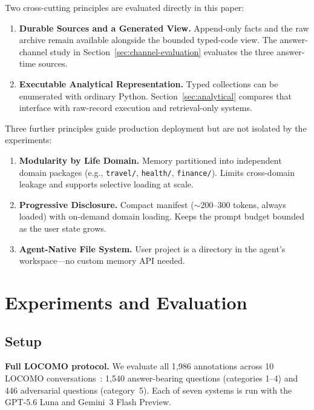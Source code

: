 Two cross-cutting principles are evaluated directly in this paper:

\begin{enumerate}[leftmargin=*]
\item \textbf{Durable Sources and a Generated View.} Append-only facts and the raw archive remain available alongside the bounded typed-code view. The answer-channel study in Section~\ref{sec:channel-evaluation} evaluates the three answer-time sources.
\item \textbf{Executable Analytical Representation.} Typed collections can be enumerated with ordinary Python. Section~\ref{sec:analytical} compares that interface with raw-record execution and retrieval-only systems.
\end{enumerate}

Three further principles guide production deployment but are not isolated by the experiments:

\begin{enumerate}[leftmargin=*,start=3]
\item \textbf{Modularity by Life Domain.} Memory partitioned into independent domain packages (e.g., \texttt{travel/}, \texttt{health/}, \texttt{finance/}). Limits cross-domain leakage and supports selective loading at scale.
\item \textbf{Progressive Disclosure.} Compact manifest ($\sim$200--300 tokens, always loaded) with on-demand domain loading. Keeps the prompt budget bounded as the user state grows.
\item \textbf{Agent-Native File System.} User project is a directory in the agent's workspace---no custom memory API needed.
\end{enumerate}


\section{Experiments and Evaluation}
\label{sec:experiments}

\subsection{Setup}

\textbf{Full LOCOMO protocol.}\label{sec:full-locomo-protocol} We evaluate all 1{,}986 annotations across 10 LOCOMO conversations~\citep{maharana2024locomo}: 1{,}540 answer-bearing questions (categories 1--4) and 446 adversarial questions (category~5). Each of seven systems is run with the GPT-5.6 Luna and Gemini~3 Flash Preview.

